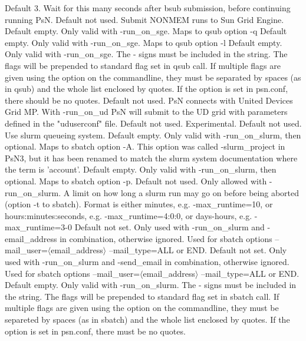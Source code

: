 \begin{optionlist}
Default 3. Wait for this many seconds after bsub submission, before continuing running PsN. 
\nextopt
{}
Default not used. Submit NONMEM runs to Sun Grid Engine.
\nextopt
{}
Default empty. Only valid with -run\_on\_sge. Maps to qsub option -q 
\nextopt
{}
Default empty. Only valid with -run\_on\_sge. Maps to qsub option -l 
\nextopt
{}
Default empty. Only valid with -run\_on\_sge. The - signs must be included in the string. The flags will be prepended to standard flag set in qsub call. If multiple flags are given using the option on the commandline, they must be separated by spaces (as in qsub) and the whole list enclosed by quotes. If the option is set in psn.conf, there should be no quotes. 
\nextopt
{}
Default not used. PsN connects with United Devices Grid MP. With -run\_on\_ud PsN will submit to the UD grid with parameters defined in the "uduserconf" file. 
\nextopt
{}
Default not used. Experimental.
\nextopt
{}
Default not used. Use slurm queueing system.
\nextopt
{}
Default empty. Only valid with -run\_on\_slurm, then optional. Maps to sbatch option -A. This option was called -slurm\_project in PsN3, but it has been renamed to match the slurm system documentation where the term is 'account'.
\nextopt
{}
Default empty. Only valid with -run\_on\_slurm, then optional. Maps to sbatch option -p.
\nextopt
{}
Default not used. Only allowed with -run\_on\_slurm. A limit on how long a slurm run may go on before being aborted (option -t to sbatch). Format is either minutes, e.g. -max\_runtime=10, or hours:minutes:seconds, e.g. -max\_runtime=4:0:0, or days-hours, e.g. -max\_runtime=3-0 
\nextopt
{}
Default not set. Only used with -run\_on\_slurm and -email\_address in combination, otherwise ignored. Used for sbatch options --mail\_user=$\langle$email\_address$\rangle$ --mail\_type=ALL or END.  
\nextopt
{}
Default not set. Only used with -run\_on\_slurm and -send\_email in combination, otherwise ignored. Used for sbatch options --mail\_user=$\langle$email\_address$\rangle$ --mail\_type=ALL or END.  
\nextopt
{}
Default empty. Only valid with -run\_on\_slurm. The - signs must be included in the string. The flags will be prepended to standard flag set in sbatch call. If multiple flags are given using the option on the commandline, they must be separeted by spaces (as in sbatch) and the whole list enclosed by quotes. If the option is set in psn.conf, 
there must be no quotes. 
\nextopt
\end{optionlist}



